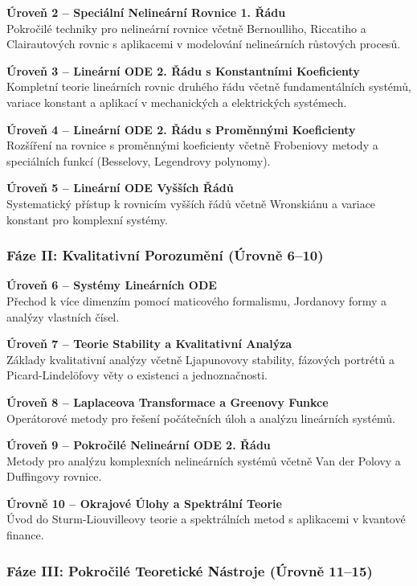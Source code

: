 \textbf{Úroveň 2 – Speciální Nelineární Rovnice 1. Řádu}\\
Pokročilé techniky pro nelineární rovnice včetně Bernoulliho, Riccatiho a Clairautových rovnic s aplikacemi v modelování nelineárních růstových procesů.

\textbf{Úroveň 3 – Lineární ODE 2. Řádu s Konstantními Koeficienty}\\
Kompletní teorie lineárních rovnic druhého řádu včetně fundamentálních systémů, variace konstant a aplikací v mechanických a elektrických systémech.

\textbf{Úroveň 4 – Lineární ODE 2. Řádu s Proměnnými Koeficienty}\\
Rozšíření na rovnice s proměnnými koeficienty včetně Frobeniovy metody a speciálních funkcí (Besselovy, Legendrovy polynomy).

\textbf{Úroveň 5 – Lineární ODE Vyšších Řádů}\\
Systematický přístup k rovnicím vyšších řádů včetně Wronskiánu a variace konstant pro komplexní systémy.

\subsubsection{Fáze II: Kvalitativní Porozumění (Úrovně 6–10)}

\textbf{Úroveň 6 – Systémy Lineárních ODE}\\
Přechod k více dimenzím pomocí maticového formalismu, Jordanovy formy a analýzy vlastních čísel.

\textbf{Úroveň 7 – Teorie Stability a Kvalitativní Analýza}\\
Základy kvalitativní analýzy včetně Ljapunovovy stability, fázových portrétů a Picard-Lindelöfovy věty o existenci a jednoznačnosti.

\textbf{Úroveň 8 – Laplaceova Transformace a Greenovy Funkce}\\
Operátorové metody pro řešení počátečních úloh a analýzu lineárních systémů.

\textbf{Úroveň 9 – Pokročilé Nelineární ODE 2. Řádu}\\
Metody pro analýzu komplexních nelineárních systémů včetně Van der Polovy a Duffingovy rovnice.

\textbf{Úrovně 10 – Okrajové Úlohy a Spektrální Teorie}\\
Úvod do Sturm-Liouvilleovy teorie a spektrálních metod s aplikacemi v kvantové finance.

\subsubsection{Fáze III: Pokročilé Teoretické Nástroje (Úrovně 11–15)}

